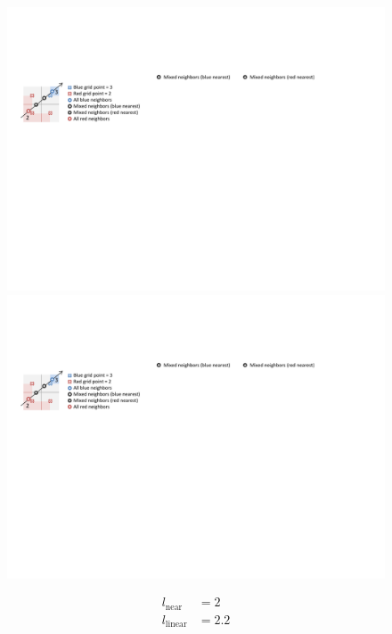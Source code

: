 \documentclass{egpubl}
\begin{document}
\begin{figure}
\centering
\begin{minipage}{0.44\linewidth}
\includegraphics[width=1.0\linewidth]{figures/Neighborhood_all}
\end{minipage}\hfill
\begin{minipage}{0.27\linewidth}
\begin{minipage}{1.0\linewidth}
\includegraphics[width=1.0\linewidth]{figures/Neighborhood_red}
\end{minipage}
\begin{minipage}{1.0\linewidth}
\begin{align}
l_\mathrm{near} &= 2\nonumber\\
l_\mathrm{linear} &= 2.2\nonumber\\

\end{align}
\end{minipage}
\end{minipage}
\end{figure}
\end{document}
